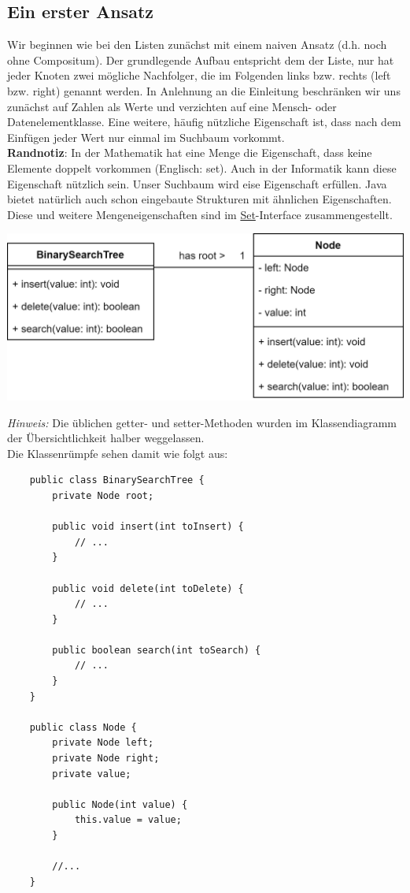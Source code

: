 \documentclass{article}
\begin{document}
\subsection{Ein erster Ansatz}

Wir beginnen wie bei den Listen zunächst mit einem naiven Ansatz (d.h. noch ohne Compositum). Der grundlegende Aufbau entspricht dem der Liste, nur hat jeder Knoten zwei mögliche Nachfolger, die im Folgenden links bzw. rechts (left bzw. right) genannt werden. In Anlehnung an die Einleitung beschränken wir uns zunächst auf Zahlen als Werte und verzichten auf eine Mensch- oder Datenelementklasse. Eine weitere, häufig nützliche Eigenschaft ist, dass nach dem Einfügen jeder Wert nur einmal im Suchbaum vorkommt. \\
\textbf{Randnotiz}: In der Mathematik hat eine Menge die Eigenschaft, dass keine Elemente doppelt vorkommen (Englisch: set). Auch in der Informatik kann diese Eigenschaft nützlich sein. Unser Suchbaum wird eise Eigenschaft erfüllen. Java bietet natürlich auch schon eingebaute Strukturen mit ähnlichen Eigenschaften. Diese und weitere Mengeneigenschaften sind im \href{https://docs.oracle.com/javase/7/docs/api/java/util/Set.html}{Set}-Interface zusammengestellt.
\begin{center}
    \includegraphics[scale=0.25]{../../media/bin_tree_basic.png}
\end{center}
\textit{Hinweis:} Die üblichen getter- und setter-Methoden wurden im Klassendiagramm der Übersichtlichkeit halber weggelassen. \\
Die Klassenrümpfe sehen damit wie folgt aus:
\begin{verbatim}
    public class BinarySearchTree {
        private Node root;

        public void insert(int toInsert) {
            // ... 
        }

        public void delete(int toDelete) {
            // ...
        }

        public boolean search(int toSearch) {
            // ...
        }
    }

    public class Node {
        private Node left;
        private Node right;
        private value; 

        public Node(int value) {
            this.value = value;
        }

        //...
    }
\end{verbatim}
\end{document}
